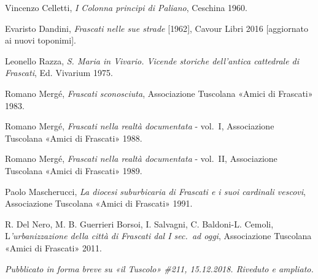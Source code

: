 \documentclass[
  letterpaper,
  DIV=11,
  numbers=noendperiod]{scrartcl}
\begin{document}
Vincenzo Celletti, \emph{I Colonna principi di Paliano}, Ceschina 1960.

Evaristo Dandini, \emph{Frascati nelle sue strade} {[}1962{]}, Cavour
Libri 2016 {[}aggiornato ai nuovi toponimi{]}.

Leonello Razza, \emph{S. Maria in Vivario. Vicende storiche dell'antica
cattedrale di Frascati}, Ed. Vivarium 1975.

Romano Mergé, \emph{Frascati sconosciuta}, Associazione Tuscolana «Amici
di Frascati» 1983.

Romano Mergé, \emph{Frascati nella realtà documentata} - vol.~I,
Associazione Tuscolana «Amici di Frascati» 1988.

Romano Mergé, \emph{Frascati nella realtà documentata} - vol.~II,
Associazione Tuscolana «Amici di Frascati» 1989.

Paolo Mascherucci, \emph{La diocesi suburbicaria di Frascati e i suoi
cardinali vescovi}, Associazione Tuscolana «Amici di Frascati» 1991.

R. Del Nero, M. B. Guerrieri Borsoi, I. Salvagni, C. Baldoni-L. Cemoli,
L\emph{'urbanizzazione della città di Frascati dal I sec.~ad oggi},
Associazione Tuscolana «Amici di Frascati» 2011.

\emph{Pubblicato in forma breve su «il Tuscolo» \#211, 15.12.2018.
Riveduto e ampliato.}
\end{document}
